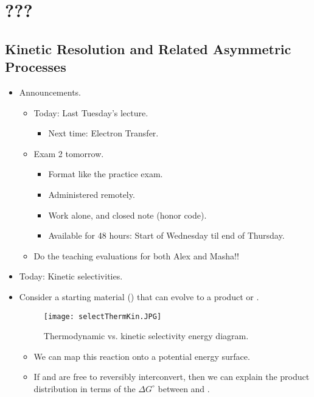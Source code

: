\documentclass[../notes.tex]{subfiles}
\begin{document}
\chapter{???}
\section{Kinetic Resolution and Related Asymmetric Processes}
\begin{itemize}
    \item {}Announcements.
    \begin{itemize}
        \item Today: Last Tuesday's lecture.
        \begin{itemize}
            \item Next time: Electron Transfer.
        \end{itemize}
        \item Exam 2 tomorrow.
        \begin{itemize}
            \item Format like the practice exam.
            \item Administered remotely.
            \item Work alone, and closed note (honor code).
            \item Available for 48 hours: Start of Wednesday til end of Thursday.
        \end{itemize}
        \item Do the teaching evaluations for both Alex and Masha!!
    \end{itemize}
    \item Today: Kinetic selectivities.
    \item Consider a starting material () that can evolve to a product  or .
    \begin{figure}[h!]
        \centering
        \texttt{[image: selectThermKin.JPG]}
        \caption{Thermodynamic vs. kinetic selectivity energy diagram.}
        \label{fig:selectThermKin}
    \end{figure}
    \begin{itemize}
        \item We can map this reaction onto a potential energy surface.
        \item If  and  are free to reversibly interconvert, then we can explain the product distribution in terms of the $\Delta G^\circ$ between  and .
        \begin{itemize}

\end{itemize}
\end{itemize}
\end{itemize}
\end{document}
